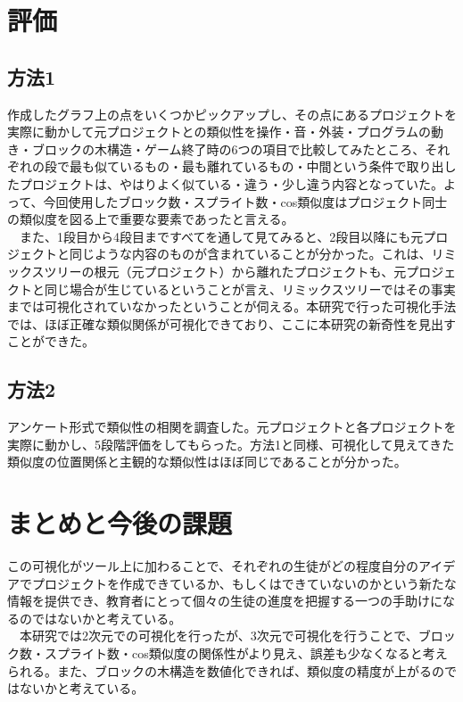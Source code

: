 \documentclass[twocolumn,9pt,a4paper]{jsarticle}
\begin{document}
\section{評価}
\subsection{方法1}
作成したグラフ上の点をいくつかピックアップし、その点にあるプロジェクトを実際に動かして元プロジェクトとの類似性を操作・音・外装・プログラムの動き・ブロックの木構造・ゲーム終了時の6つの項目で比較してみたところ、それぞれの段で最も似ているもの・最も離れているもの・中間という条件で取り出したプロジェクトは、やはりよく似ている・違う・少し違う内容となっていた。よって、今回使用したブロック数・スプライト数・cos類似度はプロジェクト同士の類似度を図る上で重要な要素であったと言える。
\\
　また、1段目から4段目まですべてを通して見てみると、2段目以降にも元プロジェクトと同じような内容のものが含まれていることが分かった。これは、リミックスツリーの根元（元プロジェクト）から離れたプロジェクトも、元プロジェクトと同じ場合が生じているということが言え、リミックスツリーではその事実までは可視化されていなかったということが伺える。本研究で行った可視化手法では、ほぼ正確な類似関係が可視化できており、ここに本研究の新奇性を見出すことができた。

\subsection{方法2}
アンケート形式で類似性の相関を調査した。元プロジェクトと各プロジェクトを実際に動かし、5段階評価をしてもらった。方法1と同様、可視化して見えてきた類似度の位置関係と主観的な類似性はほぼ同じであることが分かった。

\section{まとめと今後の課題}
この可視化がツール上に加わることで、それぞれの生徒がどの程度自分のアイデアでプロジェクトを作成できているか、もしくはできていないのかという新たな情報を提供でき、教育者にとって個々の生徒の進度を把握する一つの手助けになるのではないかと考えている。
\\
　本研究では2次元での可視化を行ったが、3次元で可視化を行うことで、ブロック数・スプライト数・cos類似度の関係性がより見え、誤差も少なくなると考えられる。また、ブロックの木構造を数値化できれば、類似度の精度が上がるのではないかと考えている。
\end{document}
